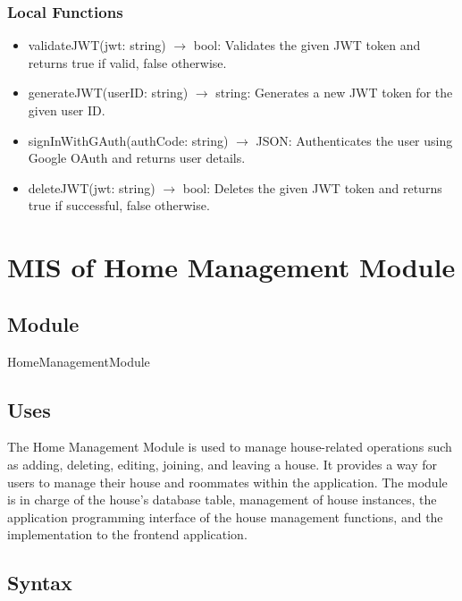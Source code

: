\documentclass[12pt, titlepage]{article}
\begin{document}
\subsubsection{Local Functions}

\begin{itemize}
  \item validateJWT(jwt: string) $\rightarrow$ bool: Validates the given JWT token and returns true if valid, false otherwise.
  \item generateJWT(userID: string) $\rightarrow$ string: Generates a new JWT token for the given user ID.
  \item signInWithGAuth(authCode: string) $\rightarrow$ JSON: Authenticates the user using Google OAuth and returns user details.
  \item deleteJWT(jwt: string) $\rightarrow$ bool: Deletes the given JWT token and returns true if successful, false otherwise.
\end{itemize}

\newpage


\section{MIS of Home Management Module} \label{Module} 

\subsection{Module}

HomeManagementModule

\subsection{Uses}

The Home Management Module is used to manage house-related operations such as adding, deleting, editing, joining, and leaving a house. It provides a way for users to manage their house and roommates within the application. The module is in charge of the house's database table, management of house instances, the application programming interface of the house management functions, and the implementation to the frontend application.

\subsection{Syntax}
\end{document}
